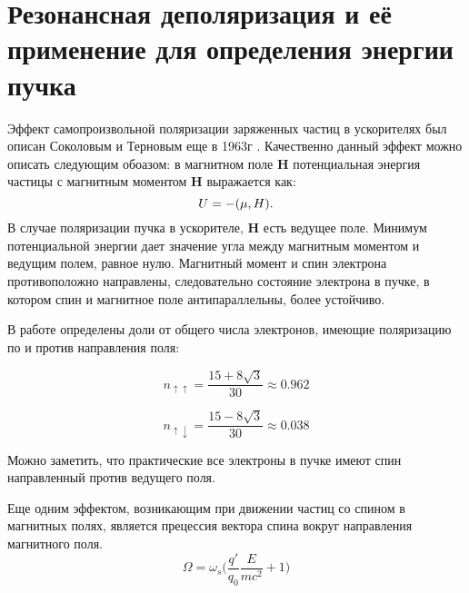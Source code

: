 \section{Резонансная деполяризация и её применение для определения энергии пучка}
\label{sec:respnant_dep}
Эффект самопроизвольной поляризации заряженных частиц в ускорителях был описан Соколовым и Терновым еще в 1963г \cite{SokolovTernov63}. Качественно данный эффект можно описать следующим обоазом: в магнитном поле $\boldsymbol{H}$ потенциальная энергия частицы с магнитным моментом  $\boldsymbol{H}$ выражается как: 
\begin{equation}
U = - (\boldmath{\mu}, \boldmath{H}).
\end{equation} 
В случае поляризации пучка в ускорителе, $\boldsymbol{H}$ есть ведущее поле. Минимум потенциальной энергии дает значение угла между магнитным моментом и ведущим полем, равное нулю. Магнитный момент и спин электрона противоположно направлены, следовательно состояние электрона в пучке, в котором спин и магнитное поле антипараллельны, более устойчиво.
\par В работе  \cite{SokolovTernov63} определены доли от общего числа электронов, имеющие поляризацию по и против направления поля: 
\begin{multicols}{2}
	\begin{equation}
	n_{\uparrow\uparrow} = \frac{15+8\sqrt{3}}{30} \approx 0.962 
	\end{equation}
	
	\begin{equation}
	n_{\uparrow\downarrow} = \frac{15-8\sqrt{3}}{30} \approx 0.038
	\end{equation}
\end{multicols}
Можно заметить, что практические все электроны в пучке имеют спин направленный против ведущего поля. 
\par Еще одним эффектом, возникающим при движении частиц со спином в магнитных полях, является прецессия вектора спина вокруг направления магнитного поля.
\begin{equation}
\Omega =  \omega_{s}\bigg(\frac{q'}{q_0}\frac{E}{mc^2}+1\bigg)
\end{equation}